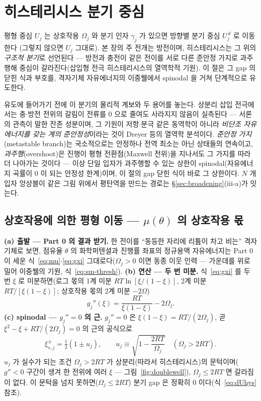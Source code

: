 \section{히스테리시스 분기 중심}\label{sec:hys}
평형 중심 $U_j$ 는 상호작용 $\Omega_j$ 와 분기 인자 $\gamma_j$ 가 있으면 방향별 분기 중심 $U_j^{\,d}$ 로 이동한다
(그렇지 않으면 $U_j$ 그대로). 본 장의 주 전개는 방전이며, 히스테리시스는 그 위의 \emph{구조적 분기}로 선언된다 --- 방전과 충전이
같은 전이를 서로 다른 준안정 가지로 과주행해 중심이 갈라진다(삽입형 전극 히스테리시스의 열역학적 기원\cite{dreyer2010}).
이 절은 그 gap 의 닫힌 식과 부호를, 격자기체 자유에너지의
이중웰에서 spinodal 을 거쳐 단계적으로 유도한다.

유도에 들어가기 전에 이 분기의 물리적 계보와 두 용어를 놓는다. 상분리 삽입 전극에서는 충$\cdot$방전
전위의 갈림이 전류를 $0$ 으로 줄여도 사라지지 않음이 실측된다 --- 서론의 관측이 말한 잔존 성분이며, 그
기원이 저항$\cdot$분극 같은 동역학이 아니라 \emph{비단조 자유에너지를 갖는 계의 준안정성}이라는 것이
Dreyer 등의 열역학 분석이다\cite{dreyer2010,dreyer2011}. \emph{준안정 가지}(metastable branch)는
국소적으로는 안정하나 전역 최소는 아닌 상태들의 연속이고, \emph{과주행}(overshoot)은 진행이 평형
전환점(Maxwell 전위)을 지나서도 그 가지를 따라 더 나아가는 것이다 --- 이상 단일 입자가 과주행할 수 있는
상한이 spinodal(자유에너지 곡률이 $0$ 이 되는 안정성 한계)이며, 이 절의 gap 닫힌 식이 바로 그 상한이다.
$N$ 개 입자 앙상블이 같은 그림 위에서 평탄역을 만드는 경로는 \S\ref{sec:broadening}(iii-a)가 잇는다.

\subsection{상호작용에 의한 평형 이동 --- $\mu(\theta)$ 의 상호작용 몫}\label{sec:hys-spinodal}
\textbf{(a) 출발 --- Part 0 의 결과 받기.} 한 전이를 ``동등한 자리에 리튬이 차고 비는'' 격자기체로 보면,
점유율 $\theta$ 의 화학퍼텐셜과 진행률 좌표의 정규용액 자유에너지는 Part 0 이 세운
식~\eqref{eq:mu}$\cdot$\eqref{eq:gxi} 그대로다($\Omega_j>0$ 이면 동종 이웃 인력 --- 가운데를 위로 밀어
이중웰의 기원, 식~\eqref{eq:sm-thresh}). \textbf{(b) 연산 --- 두 번 미분.}
식~\eqref{eq:gxi} 를 두 번 $\xi$ 로 미분하면(로그 몫의 1계 미분 $RT\ln[\xi/(1-\xi)]$, 2계 미분
$RT/[\xi(1-\xi)]$; 상호작용 몫의 2계 미분 $-2\Omega$)
\begin{equation}
g_j''(\xi)=\frac{RT}{\xi(1-\xi)}-2\Omega_j.
\label{eq:gpp}
\end{equation}
\textbf{(c) spinodal --- $g_j''=0$ 의 근.} $g_j''=0$ 은 $\xi(1-\xi)=RT/(2\Omega_j)$, 곧 $\xi^2-\xi+RT/(2\Omega_j)=0$
의 근의 공식으로
\begin{equation}
\xi_{s,j}^\pm=\tfrac12(1\pm u_j),\qquad
u_j\equiv\sqrt{1-\frac{2RT}{\Omega_j}}\quad(\Omega_j>2RT).
\label{eq:spinodal}
\end{equation}
$u_j$ 가 실수가 되는 조건 $\Omega_j>2RT$ 가 상분리(따라서 히스테리시스)의 문턱이며($g''<0$ 구간이 생겨 한 전위에 여러
$\xi$ --- 그림~\ref{fig:doublewell}), $\Omega_j\le2RT$ 면 갈라짐이 없다. 이 문턱을 넘지 못하면($\Omega_j\le2RT$) 분기 gap 은 정확히 0 이다(식~\eqref{eq:dUhys} 참조).

